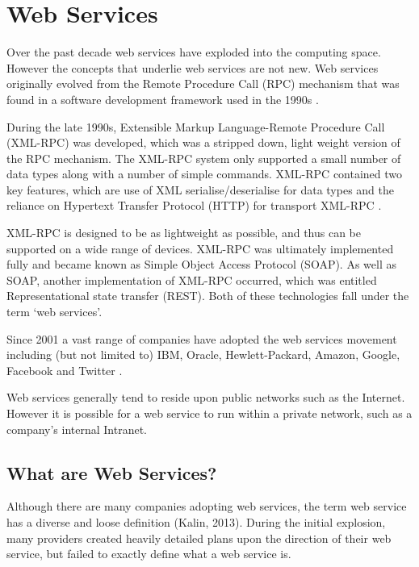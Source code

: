 \section{Web Services}

Over the past decade web services have exploded into the computing space.
However the concepts that underlie web services are not new. Web services
originally evolved from the Remote Procedure Call (RPC) mechanism that was found
in a software development framework used in the 1990s \citep{kalin13}.

During the late 1990s, Extensible Markup Language-Remote Procedure Call (XML-RPC) was developed, which was a stripped down, light 
weight version of the RPC mechanism. The XML-RPC system only 
supported a small number of data types along with a number of simple commands. 
XML-RPC contained two key features, which are use of XML serialise/deserialise 
for data types and the reliance on Hypertext Transfer Protocol (HTTP) for transport XML-RPC \citep{kalin13}.

XML-RPC is designed to be as lightweight as possible, and thus can be supported
on a wide range of devices. XML-RPC was ultimately implemented fully and became
known as  Simple Object Access Protocol (SOAP). As well as SOAP, another implementation of XML-RPC occurred, 
which was entitled Representational state transfer (REST). Both of these technologies fall under the term `web 
services'.

Since 2001 a vast range of companies have adopted the web services movement 
including (but not limited to) IBM, Oracle, Hewlett-Packard, Amazon, Google, 
Facebook and Twitter \citep{sullivan01, kalin13}.

Web services generally tend to reside upon public networks such as the 
Internet. However it is possible for a web service to run within a private 
network, such as a company's internal Intranet. 


\newpage
\subsection{What are Web Services?}

Although there are many companies adopting web services, the term web service 
has a diverse and loose definition (Kalin, 2013). During the initial explosion, 
many providers created heavily detailed plans upon the direction of their web 
service, but failed to exactly define what a web service is.

